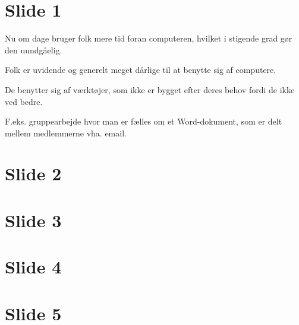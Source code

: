 \documentclass{article}
\author{Mikkel Kragh, Jannik Gram, Rune Abrahamsson, Rasmus Abrahamsen}
\date{\today}
\begin{document}
\section*{Slide 1}

Nu om dage bruger folk mere tid foran computeren, hvilket i stigende grad gør den uundgåelig.

Folk er uvidende og generelt meget dårlige til at benytte sig af computere.

De benytter sig af værktøjer, som ikke er bygget efter deres behov fordi de ikke ved bedre.

F.eks. gruppearbejde hvor man er fælles om et Word-dokument, som er delt mellem medlemmerne vha. email.

\section*{Slide 2}

\section*{Slide 3}

\section*{Slide 4}

\section*{Slide 5}
\end{document}

